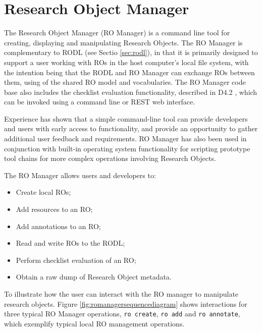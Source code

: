 \section{Research Object Manager}
\label{sec:romanager}


The Research Object Manager (RO Manager) is a command line tool for creating, displaying and manipulating Research Objects. The RO Manager is complementary to RODL (see Sectio \ref{sec:rodl}), in that it is primarily designed to support a user working with ROs in the host computer's local file system, with the intention being that the RODL and RO Manager can exchange ROs between them, using of the shared RO model and vocabularies.  The RO Manager code base also includes the checklist evaluation functionality, described in D4.2 \cite{D4.2v2}, which can be invoked using a command line or REST web interface.

Experience has shown that a simple command-line tool can provide developers and users with early access to functionality, and provide an opportunity to gather additional user feedback and requirements.  RO Manager has also been used in conjunction with built-in operating system functionality for scripting prototype tool chains for more complex operations involving Research Objects.

The RO Manager allows users and developers to:

\begin{itemize}

\item Create local ROs;
\item Add resources to an RO;
\item Add annotations to an RO;
\item Read and write ROs to the RODL;
\item Perform checklist evaluation of an RO;
\item Obtain a raw dump of Research Object metadata.
\end{itemize}

To illustrate how the user can interact with the RO manager to manipulate research objects. Figure \ref{fig:romanagersequencediagram} shows interactions for three typical RO Manager operations, \texttt{ro create}, \texttt{ro add} and
\texttt{ro annotate}, which exemplify typical local RO management operations.

